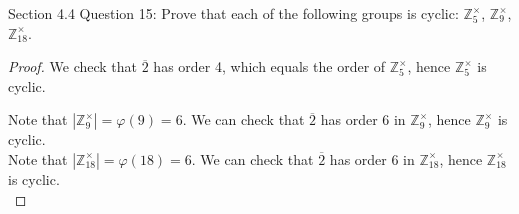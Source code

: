 Section 4.4 Question 15: Prove that each of the following groups is cyclic:
$\mathbb{Z}_5^\times$, $\mathbb{Z}_9^\times$, $\mathbb{Z}_{18}^\times$.

\begin{proof}
  We check that $\overline{2}$ has order 4, which equals the order of
  $\mathbb{Z}_5^\times$, hence $\mathbb{Z}_5^\times$ is cyclic.

  Note that $|\mathbb{Z}_9^\times|=\varphi(9)=6$. We can check that
  $\overline{2}$ has order 6 in $\mathbb{Z}_9^\times$, hence
  $\mathbb{Z}_9^\times$ is cyclic. \\

  Note that $|\mathbb{Z}_{18}^\times|=\varphi(18)=6$. We can check that
  $\overline{2}$ has order 6 in $\mathbb{Z}_{18}^\times$, hence
  $\mathbb{Z}_{18}^\times$ is cyclic. \\
\end{proof}
